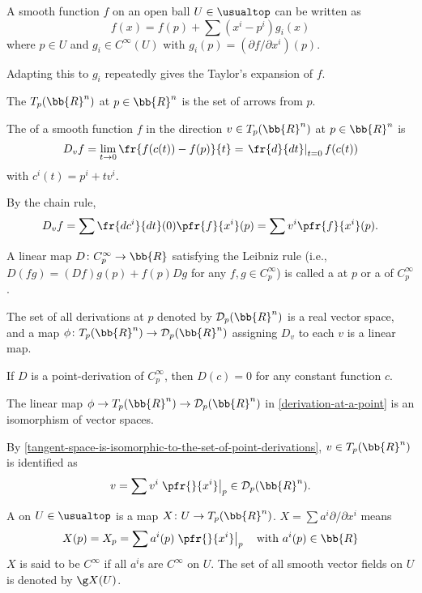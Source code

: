 \cite{loring}
A smooth function $f$ on an open ball $U \in \usualtop$ can be written as
\[
f(x) = f(p) + \sum (x^i - p^i) g_i(x)
\]
where $p \in U$ and $g_i \in C^\infty (U)$ with $g_i(p) = (\partial f / \partial x^i)(p)$.

Adapting this to $g_i$ repeatedly gives the Taylor's expansion of $f$.

The  $T_p (\bb{R}^n)$ at $p \in \bb{R}^n$ is the set of arrows from $p$.

The  of a smooth function $f$ in the direction $v \in T_p(\bb{R}^n)$ at $p \in \bb{R}^n$ is
\[
D_v f = \lim_{t \to 0} \fr{f(c(t)) - f(p)}{t} = \left. \fr{d}{dt}\right|_{t=0} f(c(t))
\]
with $c^i(t) = p^i + tv^i$.

By the chain rule,
\[
D_v f = \sum \fr{dc^i}{dt}(0)\pfr{f}{x^i}(p) = \sum v^i \pfr{f}{x^i}(p).
\]

A linear map $D \colon C_p^\infty \to \bb{R}$ satisfying the Leibniz rule (i.e., $D(fg) = (D f)g(p) + f(p)D g$ for any $f, g \in C_p^\infty$) is called a  at $p$ or a  of $C_p^\infty$.

The set of all derivations at $p$ denoted by $\mathcal{D}_p(\bb{R}^n)$ is a real vector space, and a map $\phi \colon T_p(\bb{R}^n) \to \mathcal{D}_p(\bb{R}^n)$ assigning $D_v$ to each $v$ is a linear map.

If $D$ is a point-derivation of $C_p^\infty$, then $D(c) = 0$ for any constant function $c$.

The linear map $\phi \to T_p(\bb{R}^n) \to \mathcal{D}_p(\bb{R}^n)$ in \ref{derivation-at-a-point} is an isomorphism of vector spaces.

By \ref{tangent-space-is-isomorphic-to-the-set-of-point-derivations}, $v \in T_p(\bb{R}^n)$ is identified as
\[
v = \sum v^i \left.\pfr{}{x^i}\right|_p \in \mathcal{D}_p(\bb{R}^n).
\]

A  on $U \in \usualtop$ is a map $X \colon U \to T_p(\bb{R}^n)$. $X = \sum a^i \partial / \partial x^i$ means
\[
X(p) = X_p = \sum a^i(p) \left. \pfr{}{x^i} \right|_p \quad \text{with } a^i (p) \in \bb{R}
\]
$X$ is said to be $C^\infty$ if all $a^i$s are $C^\infty$ on $U$. The set of all smooth vector fields on $U$ is denoted by $\g X(U)$.

